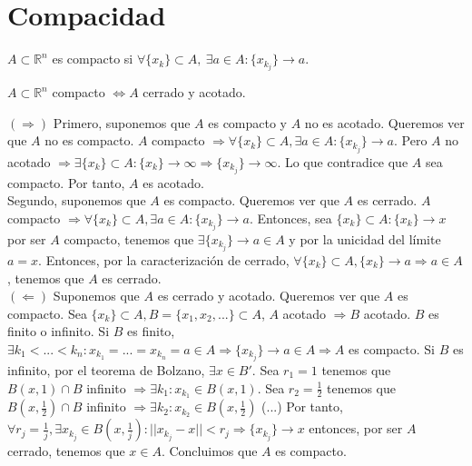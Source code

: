 \section{Compacidad}

\begin{defn}
$ A \subset \mathbb{R}^n$ es compacto si $\forall \{x_k\} \subset A, \ \exists a \in A: \{x_{k_j}\} \rightarrow a$.
\end{defn}

\begin{theo}
$A \subset \mathbb{R}^n$ compacto $ \Leftrightarrow A$ cerrado y acotado.
\end{theo}

\begin{dem}
$(\Rightarrow)$ Primero, suponemos que $A$ es compacto y $A$ no es acotado. Queremos ver que $A$ no es compacto. $A$ compacto $ \Rightarrow \forall \{x_k\} \subset A,  \exists a \in A: \{x_{k_j}\} \rightarrow a$. Pero $A$ no acotado $\Rightarrow \exists\{x_k\}\subset A: \{x_k\} \rightarrow \infty \Rightarrow \{x_{k_j}\} \rightarrow \infty$. Lo que contradice que $A$ sea compacto. Por tanto, $A$ es acotado.\\

Segundo, suponemos que $A$ es compacto. Queremos ver que $A$ es cerrado. $A$ compacto $ \Rightarrow \forall \{x_k\} \subset A, \exists a \in A: \{x_{k_j}\} \rightarrow a$. Entonces, sea $\{x_k\}\subset A : \{x_k\} \rightarrow x$ por ser $A$ compacto, tenemos que $\exists\{x_{k_j}\} \rightarrow a\in A$ y por la unicidad del límite $a = x$. Entonces, por la caracterización de cerrado, $\forall \{x_k\}\subset A, \{x_k\} \rightarrow a \Rightarrow a\in A$, tenemos que $A$ es cerrado. \\


$(\Leftarrow)$ Suponemos que $A$ es cerrado y acotado. Queremos ver que $A$ es compacto. Sea $\{x_k\} \subset A, B = \{x_1,x_2,...\}\subset A$, $A$ acotado $\Rightarrow B$ acotado. $B$ es finito o infinito. Si $B$ es finito, $\exists k_1<...<k_n : x_{k_1} = ... = x_{k_n} = a \in A \Rightarrow \{x_{k_j}\} \rightarrow a \in A \Rightarrow A$ es compacto. Si $B$ es infinito, por el teorema de Bolzano, $\exists x \in B'$. Sea $r_1 = 1$ tenemos que $B(x,1)\cap B$ infinito $\Rightarrow \exists k_1: x_{k_1} \in B(x,1) $. Sea $r_2 = \frac{1}{2}$ tenemos que $B(x,\frac{1}{2})\cap B$ infinito $\Rightarrow \exists k_2: x_{k_2} \in B(x,\frac{1}{2}) $ (...) Por tanto, $\forall r_j = \frac{1}{j}, \exists x_{k_j} \in B(x,\frac{1}{j}): ||x_{k_j} - x|| < r_j \Rightarrow \{x_{k_j}\} \rightarrow x$ entonces, por ser $A$ cerrado, tenemos que $x\in A$. Concluimos que $A$ es compacto.
\end{dem}

